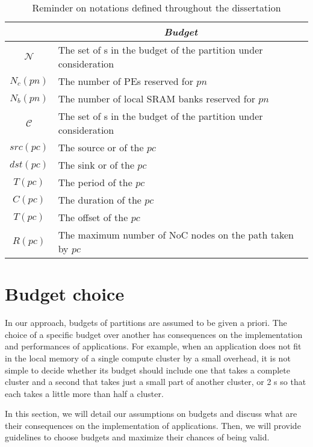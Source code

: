 \documentclass[main.tex]{subfiles}
\begin{document}
\begin{table}
\begin{center}
\begin{tabular*}{\linewidth}{@{\extracolsep{\fill}} c l}
        \hline
         & \multicolumn{1}{c}{\emph{Budget} } \\
        \hline
        $\mathcal{N}$       & The set of \PN{}s in the budget of the partition under consideration \\
        $N_c(pn)$           & The number of PEs reserved for \PN{} $pn$\\
        $N_b(pn)$           & The number of local SRAM banks reserved for \PN{} $pn$\\
        $\mathcal{C}$       & The set of \PC{}s in the budget of the partition under consideration \\
        $src(pc)$           & The source \PN{} or \ION{} of the \PC{} $pc$ \\
        $dst(pc)$           & The sink \PN{} or \ION{} of the \PC{} $pc$ \\
        $T(pc)$             & The period of the \PC{} $pc$ \\        
        $C(pc)$             & The duration of the \PC{} $pc$ \\        
        $T(pc)$             & The offset of the \PC{} $pc$ \\        
        $R(pc)$             & The maximum number of NoC nodes on the path taken by \PC{} $pc$ \\        

        \hline	
\end{tabular*}
\end{center}
\caption{Reminder on notations defined throughout the dissertation}
\label{table_validation_notations}
\end{table}




\section{Budget choice}
In our approach, budgets of partitions are assumed to be given a priori. The choice of a specific budget over another has consequences on the implementation and performances of applications. For example, when an application does not fit in the local memory of a single compute cluster by a small overhead, it is not simple to decide whether its budget should include one \PN{} that takes a complete cluster and a second \PN{} that takes just a small part of another cluster, or 2 \PN{}s so that each takes a little more than half a cluster. 

In this section, we will detail our assumptions on budgets and discuss what are their consequences on the implementation of applications. Then, we will provide guidelines to choose budgets and maximize their chances of being valid.
\end{document}
